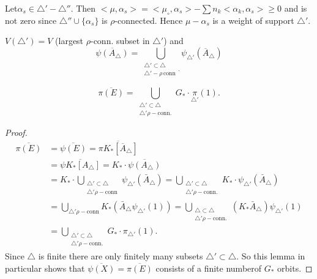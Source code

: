Let\pageoriginale $\alpha_s \in \triangle' - \triangle''$. Then $<\mu, \alpha_s>=
<\mu_\circ, \alpha_s>- \sum n_k <\alpha_k , \alpha_s > \geq 0$
and is not zero since $\triangle'' \cup \{ \alpha_s\}$ is
$\rho$-connected. Hence $\mu- \alpha_s$ is a weight of support
$\triangle'$. 

\begin{coro} \label{chap2:coro2.5}
  $V(\triangle')=V$ (largest $\rho$-conn. subset in $\triangle'$) and 
  $$
  \overline{\psi (A_\triangle)}= \bigcup_{\substack{\triangle' \subset
  \triangle\\\triangle'- \rho \,\text{conn}}.} \psi_{\triangle'}
  (\overline{A}_\triangle)
  $$
\end{coro} 

\begin{lemma} \label{chap2:lem2.6}
  $$
  \overline{\pi (E)}= \bigcup_{\substack{\triangle' \subset
      \triangle\\\triangle' \rho-\text{conn.}}} G_* \cdot
  \underset{\triangle'}{\pi} (1). 
  $$
\end{lemma}

\begin{proof}
  \begin{align*}
  \overline{\pi(E)} & = \overline{\psi (E)} = \overline{\pi K_*
    [\overline{A}_\triangle]}\\
  & = \overline{\psi K_* [A_\triangle]}= K_* \cdot \overline{\psi
    (A_\triangle)}\\
  & = K_* \cdot \bigcup_{\substack{\triangle' \subset
      \triangle\\ \triangle' \rho-\text{conn}}} \psi_{\triangle'}
  (\bar{A}_\triangle) =\bigcup_{\substack{\triangle' \subset
      \triangle\\ \triangle' \rho-\text{conn}.}} K_* \cdot
  \psi_{\triangle'} (\bar{A}_\triangle)\\
  & = \bigcup_{\triangle' \rho-\text{conn}} K_* (\bar{A}_\triangle
  \psi_{\triangle'} (1)) = \bigcup_{\substack{\triangle \subset
      \triangle\\ \triangle' \rho-\text{conn}.}} (K_*
  \bar{A}_\triangle) \psi_{\triangle'} (1)\\ %
  & = \bigcup_{\substack{\triangle' \subset
      \triangle\\ \triangle' \rho-\text{conn}.}} G_* \cdot \pi_{\triangle'}(1). 
  \end{align*}
  Since $\triangle$ is finite there are only finitely many subsets
  $\triangle' \subset \triangle$. So this lemma in particular shows
  that $\overline{\psi (X)}= \overline{\pi (E)}$ consists of a finite
  number\pageoriginale of $G_*$ orbits.
\end{proof}

